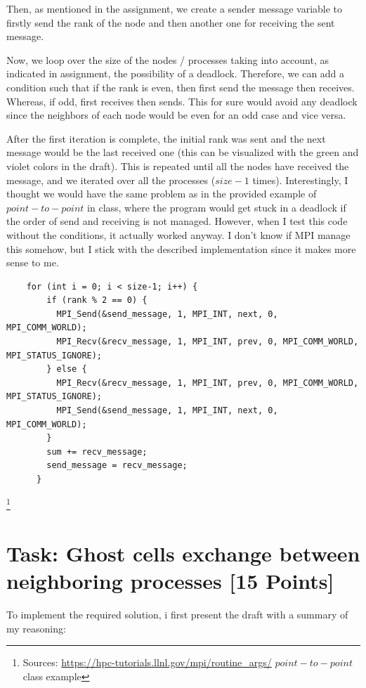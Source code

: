 \documentclass[unicode,11pt,a4paper,oneside,numbers=endperiod,openany]{scrartcl}
\begin{document}
Then, as mentioned in the assignment, we create a sender message variable to firstly send the rank of the node and then another one for receiving the sent message.

Now, we loop over the size of the nodes / processes taking into account, as indicated in assignment, the possibility of a deadlock. 
Therefore, we can add a condition such that if the rank is even, then first send the message then receives. Whereas, if odd, first receives then sends.
This for sure would avoid any deadlock since the neighbors of each node would be even for an odd case and vice versa.

After the first iteration is complete, the initial rank was sent and the next message would be the last received one
(this can be visualized with the green and violet colors in the draft). This is repeated until all the nodes have received the message, and we iterated
over all the processes ($size - 1$ times).
Interestingly, I thought we would have the same problem as in the provided example of $point-to-point$ in class, where the 
program would get stuck in a deadlock if the order of send and receiving is not managed. However, when I test this code without the conditions,
it actually worked anyway. I don't know if MPI manage this somehow, but I stick with the described implementation since it makes more sense to me. 

\begin{verbatim}
    for (int i = 0; i < size-1; i++) {
        if (rank % 2 == 0) { 
          MPI_Send(&send_message, 1, MPI_INT, next, 0, MPI_COMM_WORLD); 
          MPI_Recv(&recv_message, 1, MPI_INT, prev, 0, MPI_COMM_WORLD, MPI_STATUS_IGNORE);
        } else {
          MPI_Recv(&recv_message, 1, MPI_INT, prev, 0, MPI_COMM_WORLD, MPI_STATUS_IGNORE);
          MPI_Send(&send_message, 1, MPI_INT, next, 0, MPI_COMM_WORLD);
        }
        sum += recv_message; 
        send_message = recv_message;
      }
\end{verbatim}

\footnote{
    Sources: 
\url{https://hpc-tutorials.llnl.gov/mpi/routine_args/}
\newline 
$point-to-point$ class example
}

\section{Task: Ghost cells exchange between neighboring processes [15 Points]}

To implement the required solution, i first present the draft with a summary of my reasoning:
\end{document}
